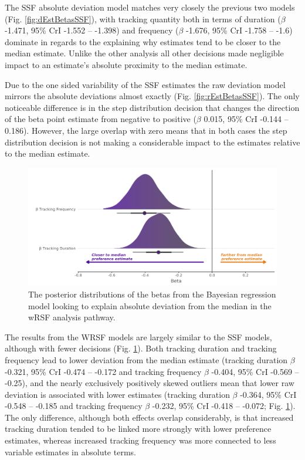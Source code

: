 \documentclass[10pt,a4paper]{article}
\begin{document}
The SSF absolute deviation model matches very closely the previous two models (Fig. \ref{fig:dEstBetasSSF}), with tracking quantity both in terms of duration (\(\beta\) -1.471, 95\% CrI -1.552 -- -1.398) and frequency (\(\beta\) -1.676, 95\% CrI -1.758 -- -1.6) dominate in regards to the explaining why estimates tend to be closer to the median estimate.
Unlike the other analysis all other decisions made negligible impact to an estimate's absolute proximity to the median estimate.

Due to the one sided variability of the SSF estimates the raw deviation model mirrors the absolute deviations almost exactly (Fig. \ref{fig:rEstBetasSSF}).
The only noticeable difference is in the step distribution decision that changes the direction of the beta point estimate from negative to positive (\(\beta\) 0.015, 95\% CrI -0.144 -- 0.186).
However, the large overlap with zero means that in both cases the step distribution decision is not making a considerable impact to the estimates relative to the median estimate.

\begin{figure}
\includegraphics[width=1\linewidth]{../figures/wrsf_dEstwrsf_effectsPlot} \caption{The posterior distributions of the betas from the Bayesian regression model looking to explain absolute deviation from the median in the wRSF analysis pathway.}\label{fig:dEstBetasWRSF}
\end{figure}

The results from the WRSF models are largely similar to the SSF models, although with fewer decisions (Fig. \ref{fig:dEstBetasWRSF}).
Both tracking duration and tracking frequency lead to lower deviation from the median estimate (tracking duration \(\beta\) -0.321, 95\% CrI -0.474 -- -0.172 and tracking frequency \(\beta\) -0.404, 95\% CrI -0.569 -- -0.25), and the nearly exclusively positively skewed outliers mean that lower raw deviation is associated with lower estimates (tracking duration \(\beta\) -0.364, 95\% CrI -0.548 -- -0.185 and tracking frequency \(\beta\) -0.232, 95\% CrI -0.418 -- -0.072; Fig. \ref{fig:dEstBetasWRSF}).
The only difference, although both effects overlap considerably, is that increased tracking duration tended to be linked more strongly with lower preference estimates, whereas increased tracking frequency was more connected to less variable estimates in absolute terms.
\end{document}
